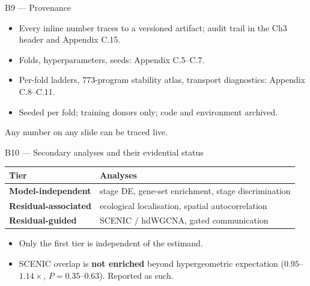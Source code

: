 \documentclass[aspectratio=169,10pt]{beamer}
\begin{document}
\begin{frame}{B9 --- Provenance}
  \begin{itemize}\small
    \item Every inline number traces to a versioned artifact; audit trail in the
          Ch3 header and Appendix C.15.
    \item Folds, hyperparameters, seeds: Appendix C.5--C.7.
    \item Per-fold ladders, 773-program stability atlas, transport diagnostics:
          Appendix C.8--C.11.
    \item Seeded per fold; training donors only; code and environment archived.
  \end{itemize}
  \vfill\begin{center}\small Any number on any slide can be traced live.\end{center}
\end{frame}

\begin{frame}{B10 --- Secondary analyses and their evidential status}
  \begin{center}\small\begin{tabular}{ll}
    \toprule Tier & Analyses\\ \midrule
    \textbf{Model-independent} & stage DE, gene-set enrichment, stage discrimination\\
    \textbf{Residual-associated} & ecological localisation, spatial autocorrelation\\
    \textbf{Residual-guided} & SCENIC / hdWGCNA, gated communication\\
    \bottomrule
  \end{tabular}\end{center}
  \vspace{.8em}
  \begin{itemize}\small
    \item Only the first tier is independent of the estimand.
    \item SCENIC overlap is \textbf{not enriched} beyond hypergeometric
          expectation ($0.95$--$1.14\times$, $P=0.35$--$0.63$). Reported as such.
  \end{itemize}
\end{frame}
\end{document}
